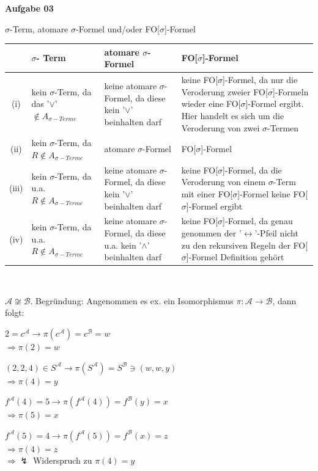 \documentclass[a4paper,10pt]{article}
\begin{document}
	\textbf{Aufgabe 03}\\
	\begin{compactenum} [(a)]
		\item $ \sigma $-Term, atomare $ \sigma $-Formel und/oder FO[$ \sigma $]-Formel \\
		
		\begin{tabular}  {c|L{4cm}|L{5cm}|L{5cm}}
			&$ \sigma $- Term & atomare $ \sigma $-Formel & FO[$ \sigma $]-Formel\\ \hline
			(i) & kein $ \sigma $-Term, da das '$ \vee $'$ \not\in A_{\sigma -Terme}$ & keine atomare $ \sigma $-Formel, da diese kein '$ \vee $' beinhalten darf & keine FO[$ \sigma $]-Formel, da nur die Veroderung zweier FO[$ \sigma $]-Formeln wieder eine FO[$ \sigma $]-Formel ergibt. Hier handelt es sich um die Veroderung von zwei $ \sigma $-Termen \\ \hline
			(ii) & kein $ \sigma $-Term, da $ R \not\in A_{\sigma -Terme}$ & atomare $ \sigma $-Formel & FO[$ \sigma $]-Formel \\ \hline
			(iii) & kein $ \sigma $-Term, da u.a. $ R \not\in A_{\sigma -Terme}$ & keine atomare $ \sigma $-Formel, da diese kein '$ \vee $' beinhalten darf & keine FO[$ \sigma $]-Formel, da die Veroderung von einem $ \sigma $-Term mit einer FO[$ \sigma $]-Formel keine FO[$ \sigma $]-Formel ergibt \\ \hline
			(iv) & kein $ \sigma $-Term, da u.a. $ R \not\in A_{\sigma -Terme}$ & keine atomare $ \sigma $-Formel, da diese u.a. kein '$ \wedge $' beinhalten darf & keine FO[$ \sigma $]-Formel, da genau genommen der '$ \leftrightarrow $'-Pfeil nicht zu den rekursiven Regeln der FO[$ \sigma $]-Formel Definition gehört 
		\end{tabular} \\
		\newpage
		\item \begin{compactitem}
			\item $ \mathcal{A} \not\cong \mathcal{B} $. Begründung: Angenommen es ex. ein Isomorphismus $ \pi : \mathcal{A} \rightarrow \mathcal{B} $, dann folgt: \\
			\begin{compactitem}
				\item $ 2 = c^\mathcal{A} \rightarrow \pi(c^\mathcal{A}) = c^\mathcal{B} = w$\\
				$ \Rightarrow \pi(2) = w $
				\item $ (2,2,4) \in S^\mathcal{A} \rightarrow \pi(S^\mathcal{A}) = S^\mathcal{B} \ni (w,w,y)$ \\
				$ \Rightarrow \pi(4) = y $
				\item $ f^\mathcal{A}(4) = 5 \rightarrow \pi(f^\mathcal{A}(4)) = f^\mathcal{B}(y) = x $ \\
				$ \Rightarrow \pi(5) = x $
				\item $ f^\mathcal{A}(5) = 4 \rightarrow \pi(f^\mathcal{A}(5)) = f^\mathcal{B}(x) = z $ \\
				$ \Rightarrow \pi(4) = z $\\
				$ \Longrightarrow \lightning$ Widerspruch zu $ \pi(4) = y $
				

\end{compactitem}
\end{compactitem}
\end{compactenum}
\end{document}
